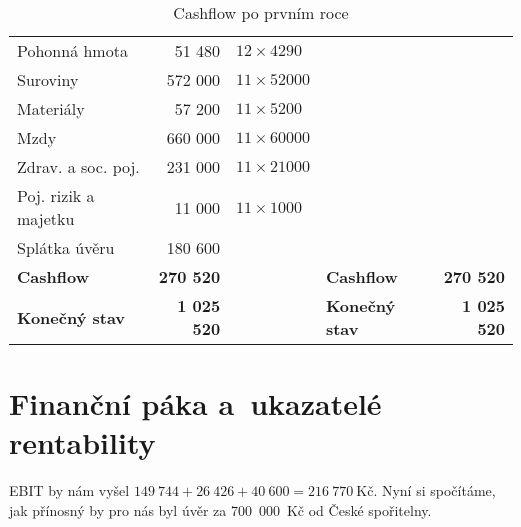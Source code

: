 \begin{table}[htbp]
\begin{center}
\begin{tabular}{lrllr}
\hspace{0,5cm}Pohonná hmota                & 51 480             & $12 \times 4290$  &                                                   &                    \\
\hspace{0,5cm}Suroviny                     & 572 000            & $11 \times 52000$ &                                                   &                    \\
\hspace{0,5cm}Materiály                    & 57 200             & $11 \times 5200$  &                                                   &                    \\
\hspace{0,5cm}Mzdy                         & 660 000            & $11 \times 60000$ &                                                   &                    \\
\hspace{0,5cm}Zdrav. a soc. poj.           & 231 000            & $11 \times 21000$ &                                                   &                    \\
\hspace{0,5cm}Poj. rizik a majetku         & 11 000             & $11 \times 1000$  & \textbf{}                                         & \textbf{}          \\
\hspace{0,5cm}Splátka úvěru                & 180 600            &                   & \textbf{}                                         & \textbf{}          \\ \hline
\textbf{Cashflow}                          & \textbf{270 520}   &                   & \textbf{Cashflow}                                 & \textbf{270 520}   \\
\textbf{Konečný stav}                      & \textbf{1 025 520} &                   & \textbf{Konečný stav}                             & \textbf{1 025 520}
\end{tabular}
\caption{Cashflow po prvním roce}
\label{cashflow}
\end{center}
\end{table}


\section{Finanční páka a~ukazatelé rentability}
EBIT by nám vyšel $149~744 + 26~426 + 40~600 = 216~770~\text{Kč}$. Nyní si spočítáme, jak přínosný by pro nás byl úvěr za 700~000~Kč od České spořitelny.

